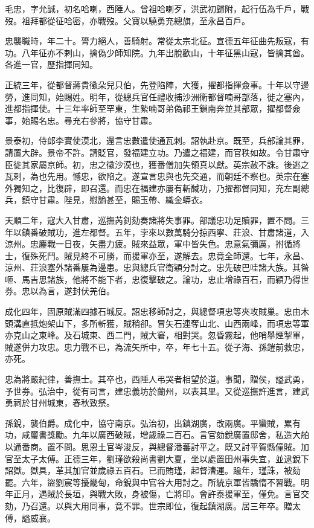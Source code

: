 \begin{pinyinscope}
毛忠，字允誠，初名哈喇，西陲人。曾祖哈喇歹，洪武初歸附，起行伍為千戶，戰歿。祖拜都從征哈密，亦戰歿。父寶以驍勇充總旗，至永昌百戶。

忠襲職時，年二十。膂力絕人，善騎射。常從太宗北征。宣德五年征曲先叛寇，有功。八年征亦不剌山，擒偽少師知院。九年出脫歡山，十年征黑山寇，皆擒其酋。各進一官，歷指揮同知。

正統三年，從都督蔣貴徵朵兒只伯，先登陷陣，大獲，擢都指揮僉事。十年以守邊勞，進同知，始賜姓。明年，從總兵官任禮收捕沙洲衛都督喃哥部落，徙之塞內，進都指揮使。十三年率師至罕東，生縶喃哥弟偽祁王鎖南奔並其部眾，擢都督僉事，始賜名忠。尋充右參將，協守甘肅。

景泰初，侍郎李實使漠北，還言忠數遣使通瓦剌。詔執赴京。既至，兵部論其罪，請置大辟。景帝不許。請貶官，發福建立功。乃遣之福建，而官秩如故。令甘肅守臣徙其家屬京師。初，忠之徵沙漠也，獲番僧加失領真以獻。英宗赦不誅。後逃之瓦剌，為也先用。憾忠，欲陷之。遂宣言忠與也先交通，而朝廷不察也。英宗在塞外獨知之，比復辟，即召還。而忠在福建亦屢有斬馘功，乃擢都督同知，充左副總兵，鎮守甘肅。陛見，慰諭甚至，賜玉帶、織金蟒衣。

天順二年，寇大入甘肅，巡撫芮釗劾奏諸將失事罪。部議忠功足贖罪，置不問。三年以鎮番破賊功，進左都督。五年，孛來以數萬騎分掠西寧、莊浪、甘肅諸道，入涼州。忠鏖戰一日夜，矢盡力疲。賊來益眾，軍中皆失色。忠意氣彌厲，拊循將士，復殊死鬥。賊見終不可勝，而援軍亦至，遂解去。忠竟全師還。七年，永昌、涼州、莊浪塞外諸番屢為邊患。忠與總兵官衛穎分討之。忠先破巴哇諸大族。其昝咂、馬吉思諸族，他將不能下者，忠復擊破之。論功，忠止增祿百石，而穎乃得世券。忠以為言，遂封伏羌伯。

成化四年，固原賊滿四據石城反。詔忠移師討之，與總督項忠等夾攻賊巢。忠由木頭溝直抵炮架山下，多所斬獲，賊稍卻。冒矢石連奪山北、山西兩峰，而項忠等軍亦克山之東峰。及石城東、西二門，賊大窘，相對哭。忽昏霧起，他哨舉煙掣軍，賊遂併力攻忠。忠力戰不已，為流矢所中，卒，年七十五。從子海、孫鎧前救忠，亦死。

忠為將嚴紀律，善撫士。其卒也，西陲人弔哭者相望於道。事聞，贈侯，謚武勇，予世券。弘治中，從有司言，建忠義坊於蘭州，以表其里。又從巡撫許進言，建武勇祠於甘州城東，春秋致祭。

孫銳，襲伯爵。成化中，協守南京。弘治初，出鎮湖廣，改兩廣。平蠻賊，累有功，咸璽書獎勵。九年以廣西破賊，增歲祿二百石。言官劾銳廣置邸舍，私造大舶以通番商。置不問。思恩土官岑浚反，與總督潘蕃討平之。既又討平賀縣僮賊。加官至太子太傅。正德三年，劉瑾欲殺尚書劉大夏，坐以處置田州事失宜，並逮銳下詔獄。獄具，革其加官並歲祿五百石。已而賄瑾，起督漕運。踰年，瑾誅，被劾罷。六年，盜劉宸等擾畿甸，命銳與中官谷大用討之。所統京軍皆驕惰不習戰。明年正月，遇賊於長垣，與戰大敗，身被傷，亡將印。會許泰援軍至，僅免。言官交劾，乃召還。以與大用同事，竟不罪。世宗即位，復起鎮湖廣。居三年卒。贈太傅，謚威襄。


\end{pinyinscope}
